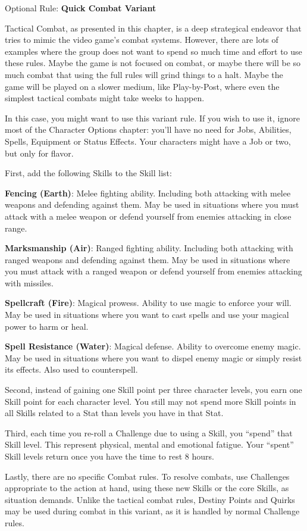 \begin{multiboco}
Optional Rule: \textbf{Quick Combat Variant}

Tactical Combat, as presented in this
chapter, is a deep strategical endeavor that tries
to mimic the video game's combat systems.
However, there are lots of examples where the
group does not want to spend so much time and
effort to use these rules. Maybe the game is not
focused on combat, or maybe there will be so
much combat that using the full rules will grind
things to a halt. Maybe the game will be played
on a slower medium, like Play-by-Post, where
even the simplest tactical combats might take
weeks to happen.

In this case, you might want to use this
variant rule. If you wish to use it, ignore most of
the Character Options chapter: you'll have no
need for Jobs, Abilities, Spells, Equipment or
Status Effects. Your characters might have a Job
or two, but only for flavor.

First, add the following Skills to the Skill
list:

\textbf{Fencing (Earth)}: Melee fighting ability.
Including both attacking with melee weapons
and defending against them. May be used in
situations where you must attack with a melee
weapon or defend yourself from enemies
attacking in close range.

\textbf{Marksmanship (Air)}: Ranged fighting
ability. Including both attacking with ranged
weapons and defending against them. May be
used in situations where you must attack with a
ranged weapon or defend yourself from enemies
attacking with missiles.

\textbf{Spellcraft (Fire)}: Magical prowess. Ability
to use magic to enforce your will. May be used in
situations where you want to cast spells and use
your magical power to harm or heal.

\textbf{Spell Resistance (Water)}: Magical defense.
Ability to overcome enemy magic. May be used
in situations where you want to dispel enemy
magic or simply resist its effects. Also used to
counterspell.

Second, instead of gaining one Skill point
per three character levels, you earn one Skill
point for each character level. You still may not
spend more Skill points in all Skills related to a
Stat than levels you have in that Stat.

Third, each time you re-roll a Challenge
due to using a Skill, you “spend” that Skill level.
This represent physical, mental and emotional
fatigue. Your “spent” Skill levels return once you
have the time to rest 8 hours.

Lastly, there are no specific Combat rules.
To resolve combats, use Challenges appropriate
to the action at hand, using these new Skills or
the core Skills, as situation demands. Unlike the
tactical combat rules, Destiny Points and Quirks
may be used during combat in this variant, as it
is handled by normal Challenge rules.
\end{multiboco}

